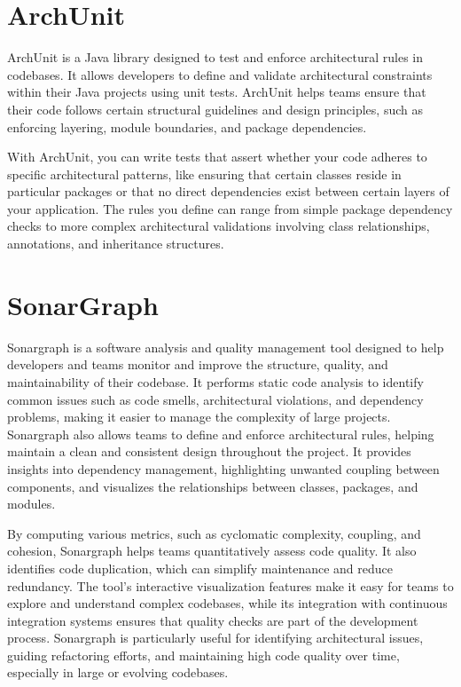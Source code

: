 \documentclass[a4paper,11pt,openright,BCOR=15mm]{scrbook}
\begin{document}
	\section{ArchUnit}
	ArchUnit is a Java library designed to test and enforce architectural rules in codebases. It allows developers to define and validate architectural constraints within their Java projects using unit tests. ArchUnit helps teams ensure that their code follows certain structural guidelines and design principles, such as enforcing layering, module boundaries, and package dependencies.
	
	With ArchUnit, you can write tests that assert whether your code adheres to specific architectural patterns, like ensuring that certain classes reside in particular packages or that no direct dependencies exist between certain layers of your application. The rules you define can range from simple package dependency checks to more complex architectural validations involving class relationships, annotations, and inheritance structures.
	
	\section{SonarGraph}
	Sonargraph is a software analysis and quality management tool designed to help developers and teams monitor and improve the structure, quality, and maintainability of their codebase. It performs static code analysis to identify common issues such as code smells, architectural violations, and dependency problems, making it easier to manage the complexity of large projects. Sonargraph also allows teams to define and enforce architectural rules, helping maintain a clean and consistent design throughout the project. It provides insights into dependency management, highlighting unwanted coupling between components, and visualizes the relationships between classes, packages, and modules.
	
	By computing various metrics, such as cyclomatic complexity, coupling, and cohesion, Sonargraph helps teams quantitatively assess code quality. It also identifies code duplication, which can simplify maintenance and reduce redundancy. The tool’s interactive visualization features make it easy for teams to explore and understand complex codebases, while its integration with continuous integration systems ensures that quality checks are part of the development process. Sonargraph is particularly useful for identifying architectural issues, guiding refactoring efforts, and maintaining high code quality over time, especially in large or evolving codebases.
	
\end{document}
